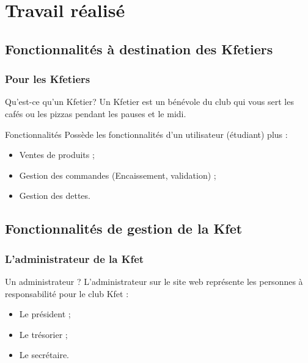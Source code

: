 \documentclass{polytech-presentation}
\newcommand{\beamerannot}[1]{
    \note{#1}
}
\begin{document}
        \section<presentation>{Travail réalisé}%

            \subsection<presentation>{Fonctionnalités à destination des Kfetiers}%
                \begin{frame}
		  \frametitle{Pour les Kfetiers}
		    \begin{block}{Qu'est-ce qu'un Kfetier?}
		     Un Kfetier est un bénévole du club qui vous sert les cafés ou les pizzas pendant les pauses et le
midi.
		    \end{block}

                    \begin{block}{Fonctionnalités}
                     Possède les fonctionnalités d'un utilisateur (étudiant) plus :
		      \begin{itemize}
		       \item Ventes de produits ;
		       \item Gestion des commandes (Encaissement, validation) ;
		       \item Gestion des dettes.
		      \end{itemize}
                    \end{block}
                    \beamerannot{}
                \end{frame}

            \subsection<presentation>{Fonctionnalités de gestion de la Kfet}%
                \begin{frame}
		  \frametitle{L'administrateur de la Kfet}
                    \begin{block}{Un administrateur ?}
		      L'administrateur sur le site web représente les personnes à responsabilité pour le club Kfet :
		      \begin{itemize}
		       \item Le président ;
		       \item Le trésorier ;
		       \item Le secrétaire.
		      \end{itemize}
                    \end{block}
                    \beamerannot{}
                \end{frame}
                
\end{document}
